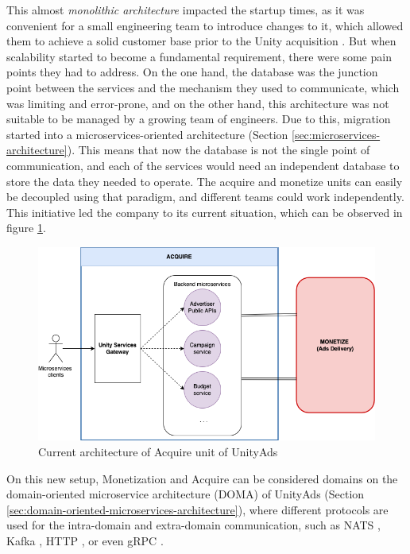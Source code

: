 \documentclass[english, 12pt, a4paper, sci, utf8, a-1b, online]{aaltothesis}
\begin{document}
This almost \textit{monolithic architecture} \cite{de2019monolithic} impacted the startup times, as it was convenient for a small engineering team to introduce changes to it, which allowed them to achieve a solid customer base prior to the Unity acquisition \cite{ApplifierCustomers}. But when scalability started to become a fundamental requirement, there were some pain points they had to address. On the one hand, the database was the junction point between the services and the mechanism they used to communicate, which was limiting and error-prone, and on the other hand, this architecture was not suitable to be managed by a growing team of engineers. Due to this, migration started into a microservices-oriented architecture (Section \ref{sec:microservices-architecture}). This means that now the database is not the single point of communication, and each of the services would need an independent database to store the data they needed to operate. The acquire and monetize units can easily be decoupled using that paradigm, and different teams could work independently. This initiative led the company to its current situation, which can be observed in figure \ref{fig:background:acquire-architecture}.\\

\begin{figure}[h!]
    \centering
    \includegraphics[scale=0.3]{src/thesis/img/background/acquire-division.png}
    \caption{Current architecture of Acquire unit of UnityAds}
    \label{fig:background:acquire-architecture}
\end{figure}

On this new setup, Monetization and Acquire can be considered domains on the domain-oriented microservice architecture (DOMA) of UnityAds (Section \ref{sec:domain-oriented-microservices-architecture}), where different protocols are used for the intra-domain and extra-domain communication, such as NATS \cite{srisuresh2008state}, Kafka \cite{kreps2011kafka}, HTTP \cite{durumeric2013analysis}, or even gRPC \cite{wang1993grpc}.\\
\end{document}
